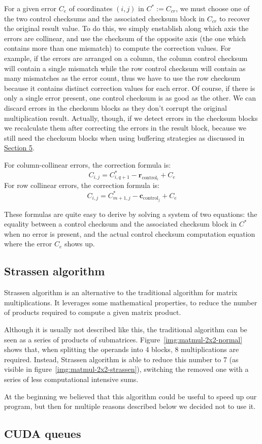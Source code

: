 For a given error $C_e$ of coordinates $(i,j)$ in $C^* := C_{cr}$, we must choose one of the two control checksums and the associated checksum block in $C_{cr}$ to recover the original result value.
To do this, we simply enstablish along which axis the errors are collinear, and use the checksum of the opposite axis (the one which contains more than one mismatch) to compute the correction values.
For example, if the errors are arranged on a column, the column control checksum will contain a single mismatch while the row control checksum will contain as many mismatches as the error count, thus we have to use the row checksum because it contains distinct correction values for each error.
Of course, if there is only a single error present, one control checksum is as good as the other.
We can discard errors in the checksum blocks
as they don't corrupt the original multiplication result.
Actually, though, if we detect errors in the checksum blocks
we recalculate them after correcting the errors in the result block,
because we still need the checksum blocks
when using buffering strategies as discussed in \hyperref[sec:strategies]{Section 5}.

For column-collinear errors, the correction formula is:
\[
	C_{i,j} = C^*_{i,q+1} - \mathbf{r}_{\text{control}_{i}} + C_e
\]
For row collinear errors, the correction formula is:
\[
	C_{i,j} = C^*_{m+1,j} - \mathbf{c}_{\text{control}_{j}} + C_e
\]

These formulas are quite easy to derive by solving a system of two equations:
the equality between a control checksum and the associated checksum block in $C^*$ when no error is present,
and the actual control checksum computation equation where the error $C_e$ shows up.

\subsection{Strassen algorithm}

Strassen algorithm is an alternative to the traditional algorithm for matrix multiplications.
It leverages some mathematical properties, to reduce the number of products required to compute a given matrix product.

Although it is usually not described like this, the traditional algorithm can be seen as a series of products of submatrices.
Figure~\ref{img:matmul-2x2-normal} shows that, when splitting the operands into 4 blocks, 8 multiplications are required.
Instead, Strassen algorithm is able to reduce this number to 7 (as visible in figure~\ref{img:matmul-2x2-strassen}), switching the removed one with a series of less computational intensive sums.

At the beginning we believed that this algorithm could be useful to speed up our program, but then for multiple reasons described below we decided not to use it.

\subsection{CUDA queues}
